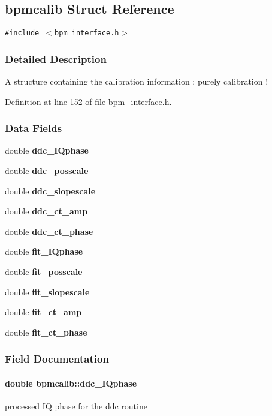 \subsection{bpmcalib Struct Reference}
\label{structbpmcalib}
{\tt \#include $<$bpm\_\-interface.h$>$}



\subsubsection{Detailed Description}
A structure containing the calibration information : purely calibration ! 

Definition at line 152 of file bpm\_\-interface.h.\subsubsection*{Data Fields}
\begin{CompactItemize}
\item 
double {\bf ddc\_\-IQphase}
\item 
double {\bf ddc\_\-posscale}
\item 
double {\bf ddc\_\-slopescale}
\item 
double {\bf ddc\_\-ct\_\-amp}
\item 
double {\bf ddc\_\-ct\_\-phase}
\item 
double {\bf fit\_\-IQphase}
\item 
double {\bf fit\_\-posscale}
\item 
double {\bf fit\_\-slopescale}
\item 
double {\bf fit\_\-ct\_\-amp}
\item 
double {\bf fit\_\-ct\_\-phase}
\end{CompactItemize}


\subsubsection{Field Documentation}
\paragraph[ddc\_\-IQphase]{\setlength{\rightskip}{0pt plus 5cm}double {\bf bpmcalib::ddc\_\-IQphase}}\hfill\label{structbpmcalib_2ea204a6c5a80f22b3edc99cf1f2100e}


processed IQ phase for the ddc routine 

